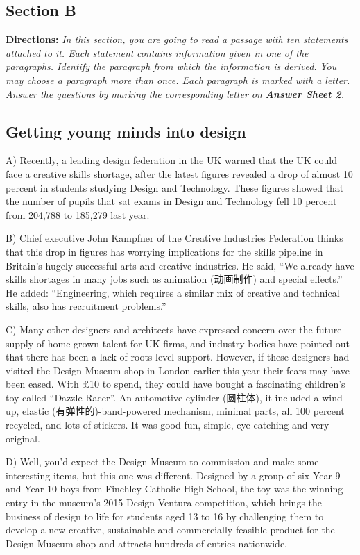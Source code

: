 \documentclass[UTF8,11pt]{ctexart}
\begin{document}
\subsection*{\textbf{Section B}}


\textbf{Directions:} \textit{In this section, you are going to read a passage with ten statements attached to it. Each statement} \textit{contains information given in one of the paragraphs. Identify the paragraph from which the information is derived.} \textit{You may choose a paragraph more than once. Each paragraph is marked with a letter. Answer the questions by} \textit{marking the corresponding letter on }\textbf{\textit{Answer Sheet 2}}\textit{.}


\subsection*{\textbf{Getting young minds into design}}


A) Recently, a leading design federation in the UK warned that the UK could face a creative skills shortage, after the latest figures revealed a drop of almost 10 percent in students studying Design and Technology. These figures showed that the number of pupils that sat exams in Design and Technology fell 10 percent from 204,788 to 185,279 last year.


B) Chief executive John Kampfner of the Creative Industries Federation thinks that this drop in figures has worrying implications for the skills pipeline in Britain’s hugely successful arts and creative industries. He said, “We already have skills shortages in many jobs such as animation (动画制作) and special effects.” He added: “Engineering, which requires a similar mix of creative and technical skills, also has recruitment problems.”


C) Many other designers and architects have expressed concern over the future supply of home-grown talent for UK firms, and industry bodies have pointed out that there has been a lack of roots-level support. However, if these designers had visited the Design Museum shop in London earlier this year their fears may have been eased. With £10 to spend, they could have bought a fascinating children’s toy called “Dazzle Racer”. An automotive cylinder (圆柱体), it included a wind-up, elastic (有弹性的)-band-powered mechanism, minimal parts, all 100 percent recycled, and lots of stickers. It was good fun, simple, eye-catching and very original.


D) Well, you’d expect the Design Museum to commission and make some interesting items, but this one was different. Designed by a group of six Year 9 and Year 10 boys from Finchley Catholic High School, the toy was the winning entry in the museum’s 2015 Design Ventura competition, which brings the business of design to life for students aged 13 to 16 by challenging them to develop a new creative, sustainable and commercially feasible product for the Design Museum shop and attracts hundreds of entries nationwide.
\end{document}
